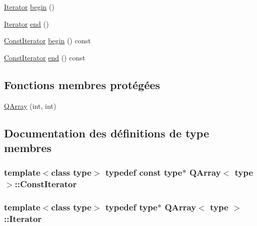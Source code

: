 \begin{DoxyCompactItemize}
\hyperlink{class_q_array_a34cdd5c57d2deab1dfd53e0d46e78cee}{Iterator} \hyperlink{class_q_array_a9e2df6d5b695fb0fa74036b57c82403a}{begin} ()
\item 
\hyperlink{class_q_array_a34cdd5c57d2deab1dfd53e0d46e78cee}{Iterator} \hyperlink{class_q_array_a16dfebf13bbbe32f4cf56d90fcd80480}{end} ()
\item 
\hyperlink{class_q_array_a1bb994357ffeb855b3f19f6562137f93}{Const\+Iterator} \hyperlink{class_q_array_a0d0d03990378e43a0e29dab1cae680b8}{begin} () const 
\item 
\hyperlink{class_q_array_a1bb994357ffeb855b3f19f6562137f93}{Const\+Iterator} \hyperlink{class_q_array_adc403533c2531fac451a8df47de95533}{end} () const 
\end{DoxyCompactItemize}
\subsection*{Fonctions membres protégées}
\begin{DoxyCompactItemize}
\item 
\hyperlink{class_q_array_a6597f735b588e282baaf467f4886f94d}{Q\+Array} (int, int)
\end{DoxyCompactItemize}


\subsection{Documentation des définitions de type membres}
\hypertarget{class_q_array_a1bb994357ffeb855b3f19f6562137f93}{}
\subsubsection[{Const\+Iterator}]{\setlength{\rightskip}{0pt plus 5cm}template$<$class type$>$ typedef const type$\ast$ {\bf Q\+Array}$<$ type $>$\+::{\bf Const\+Iterator}}\label{class_q_array_a1bb994357ffeb855b3f19f6562137f93}
\hypertarget{class_q_array_a34cdd5c57d2deab1dfd53e0d46e78cee}{}
\subsubsection[{Iterator}]{\setlength{\rightskip}{0pt plus 5cm}template$<$class type$>$ typedef type$\ast$ {\bf Q\+Array}$<$ type $>$\+::{\bf Iterator}}\label{class_q_array_a34cdd5c57d2deab1dfd53e0d46e78cee}
\hypertarget{class_q_array_a8360acb482596a511681e8dd1eadd0f0}{}
